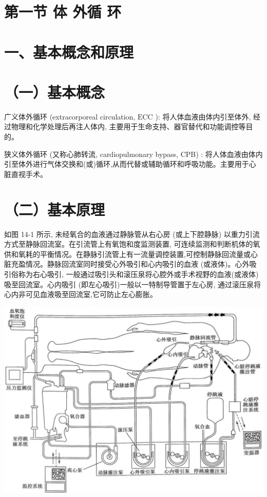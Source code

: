 \documentclass[10pt]{article}
\begin{document}
\section*{第一节 体 外循 环}
\section*{一、基本概念和原理}
\section*{（一）基本概念}
广义体外循环 (extracorporeal circulation, $\mathrm{ECC}$ ): 将人体血液由体内引至体外, 经过物理和化学处理后再注人体内, 主要用于生命支持、器官替代和功能调控等目的。

狭义体外循环 (又称心肺转流, cardiopulmonary bypass, CPB) : 将人体血液由体内引至体外进行气体交换和(或)循环,从而代替或辅助循环和呼吸功能。主要用于心脏直视手术。

\section*{（二）基本原理}
如图 14-1 所示, 未经氧合的血液通过静脉管从右心房 (或上下腔静脉) 以重力引流方式至静脉回流室。在引流管上有氧饱和度监测装置, 可连续监测和判断机体的氧供和氧耗的平衡情况。在静脉引流管上有一流量调控装置,可控制静脉回流量或心脏充盈情况。静脉回流室同时接受心外吸引和心内吸引的血液 (或液体)。心外吸引俗称为右心吸引, 一般通过吸引头和滚压泉将心腔外或手术视野的血液(或液体)吸至回流室。心内吸引 (即左心吸引)一般以一特制导管置于左心房, 通过滚压泉将心内非可见血液吸至回流室,它可防止左心膨胀。

\begin{center}
\includegraphics[max width=\textwidth]{2024_07_09_002a177993bd97d1d6d7g-149}
\end{center}
\end{document}
